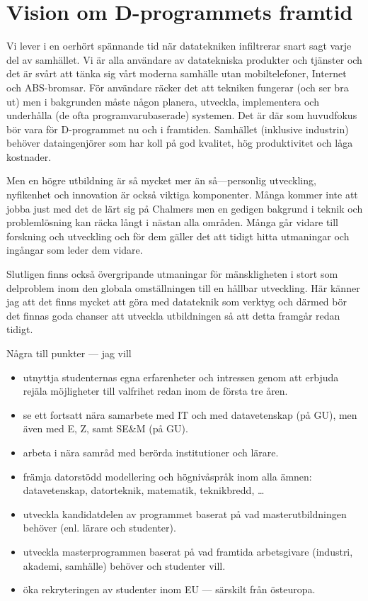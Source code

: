 \section{Vision om D-program\-mets framtid}


Vi lever i en oerhört spännande tid när datatekniken infiltrerar
snart sagt varje del av samhället.
%
Vi är alla användare av datatekniska produkter och tjänster och det
är svårt att tänka sig vårt moderna samhälle utan mobiltelefoner,
Internet och ABS-bromsar.
%
För användare räcker det att tekniken fungerar (och ser bra ut) men i
bakgrunden måste någon planera, utveckla, implementera och underhålla
(de ofta programvarubaserade) systemen.
%
Det är där som huvudfokus bör vara för D-programmet nu och i framtiden. 
%
Samhället (inklusive industrin) behöver dataingenjörer som har koll på
god kvalitet, hög produktivitet och låga kostnader.
%

Men en högre utbildning är så mycket mer än så---personlig utveckling,
nyfikenhet och innovation är också viktiga komponenter.
%
Många kommer inte att jobba just med det de lärt sig på Chalmers men
en gedigen bakgrund i teknik och problemlösning kan räcka långt i
nästan alla områden.
%
Många går vidare till forskning och utveckling och för dem gäller det
att tidigt hitta utmaningar och ingångar som leder dem vidare.

Slutligen finns också övergripande utmaningar för mänskligheten i stort
som delproblem inom den globala omställningen till en hållbar
utveckling.
%
Här känner jag att det finns mycket att göra med datateknik som
verktyg och därmed bör det finnas goda chanser att utveckla
utbildningen så att detta framgår redan tidigt. 
%

Några till punkter --- jag vill
\begin{itemize}
\item utnyttja studenternas egna erfarenheter och intressen genom att
  erbjuda rejäla möjligheter till valfrihet redan inom de första tre
  åren.
\item se ett fortsatt nära samarbete med IT och med datavetenskap (på
  GU), men även med E, Z, samt SE\&M (på GU).
\item arbeta i nära samråd med berörda institutioner och lärare.
\item främja datorstödd modellering och högnivåspråk inom alla ämnen:
  datavetenskap, datorteknik, mate\-matik, teknikbredd, \ldots
\item utveckla kandidatdelen av programmet baserat på vad
  masterutbildningen behöver (enl. lärare och studenter).
\item utveckla masterprogrammen baserat på vad framtida arbetsgivare
  (industri, akademi, samhälle) behöver och studenter vill.
\item öka rekryteringen av studenter inom EU --- särskilt från
  östeuropa.
\end{itemize}
